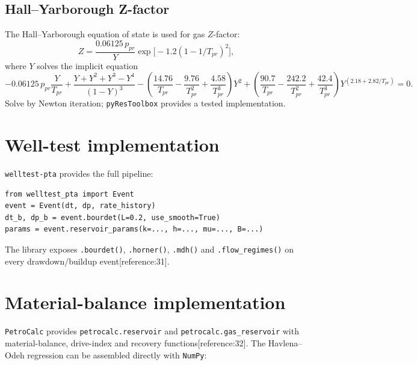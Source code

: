 \documentclass[10pt,a4paper]{article}
\begin{document}
\subsection{Hall--Yarborough Z-factor}

The Hall--Yarborough equation of state is used for gas $Z$-factor:
\begin{equation}
  Z = \frac{0.06125\,p_{pr}}{Y}\exp\!\bigl[-1.2(1-1/T_{pr})^2\bigr],
  \label{eq:hy-z}
\end{equation}
where $Y$ solves the implicit equation
\begin{equation}
  -0.06125\,p_{pr}\frac{Y}{T_{pr}}
  + \frac{Y+Y^2+Y^3-Y^4}{(1-Y)^3}
  - \left(\frac{14.76}{T_{pr}}-\frac{9.76}{T_{pr}^2}+\frac{4.58}{T_{pr}^3}\right)Y^2
  + \left(\frac{90.7}{T_{pr}}-\frac{242.2}{T_{pr}^2}+\frac{42.4}{T_{pr}^3}\right)Y^{(2.18+2.82/T_{pr})}
  = 0.
  \label{eq:hy-implicit}
\end{equation}
Solve by Newton iteration; \texttt{pyResToolbox} provides a tested
implementation.

\section{Well-test implementation}

\texttt{welltest-pta} provides the full pipeline:
\begin{lstlisting}[caption={Well-test analysis with welltest-pta.}]
from welltest_pta import Event
event = Event(dt, dp, rate_history)
dt_b, dp_b = event.bourdet(L=0.2, use_smooth=True)
params = event.reservoir_params(k=..., h=..., mu=..., B=...)
\end{lstlisting}
The library exposes \texttt{.bourdet()}, \texttt{.horner()}, \texttt{.mdh()} and
\texttt{.flow\_regimes()} on every drawdown/buildup event[reference:31].

\section{Material-balance implementation}

\texttt{PetroCalc} provides \texttt{petrocalc.reservoir} and
\texttt{petrocalc.gas\_reservoir} with material-balance, drive-index and
recovery functions[reference:32]. The Havlena--Odeh regression can be assembled
directly with \texttt{NumPy}:
\end{document}
